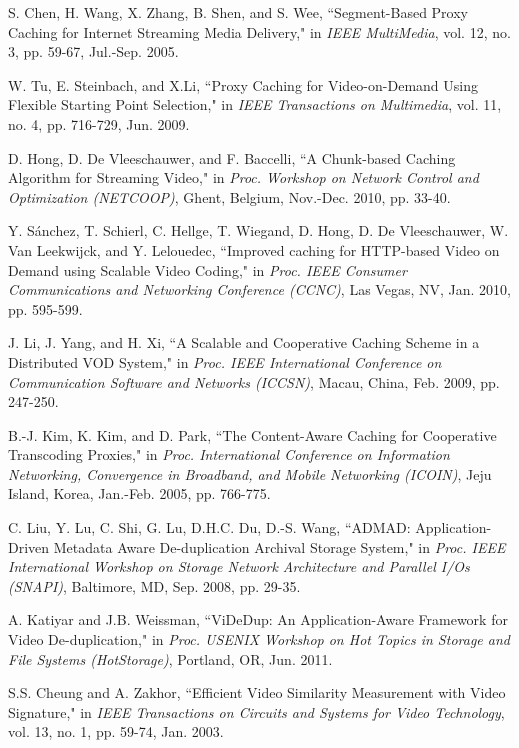 \documentclass{article}
\begin{document}
\begin{thebibliography}{99}


S. Chen, H. Wang, X. Zhang, B. Shen, and S. Wee, ``Segment-Based Proxy Caching for Internet Streaming Media Delivery," in \emph{IEEE MultiMedia}, vol. 12, no. 3, pp. 59-67, Jul.-Sep. 2005. 

W. Tu, E. Steinbach, and X.Li, ``Proxy Caching for Video-on-Demand Using Flexible Starting Point Selection," in \emph{IEEE Transactions on Multimedia}, vol. 11, no. 4, pp. 716-729, Jun. 2009.

D. Hong, D. De Vleeschauwer, and F. Baccelli, ``A Chunk-based Caching Algorithm for Streaming Video," in \emph{Proc. Workshop on Network Control and Optimization (NETCOOP)}, Ghent, Belgium, Nov.-Dec. 2010, pp. 33-40.

Y. S\'anchez, T. Schierl, C. Hellge, T. Wiegand, D. Hong, D. De Vleeschauwer, W. Van Leekwijck, and Y. Lelouedec, ``Improved caching for HTTP-based Video on Demand using Scalable Video Coding," in \emph{Proc. IEEE Consumer Communications and Networking Conference (CCNC)}, Las Vegas, NV, Jan. 2010, pp. 595-599.

J. Li, J. Yang, and H. Xi, ``A Scalable and Cooperative Caching Scheme in a Distributed VOD System," in \emph{Proc. IEEE International Conference on Communication Software and Networks (ICCSN)}, Macau, China, Feb. 2009, pp. 247-250.

B.-J. Kim, K. Kim, and D. Park, ``The Content-Aware Caching for Cooperative Transcoding Proxies," in \emph{Proc. International Conference on Information Networking, Convergence in Broadband, and Mobile Networking (ICOIN)}, Jeju Island, Korea, Jan.-Feb. 2005, pp. 766-775.

C. Liu, Y. Lu, C. Shi, G. Lu, D.H.C. Du, D.-S. Wang, ``ADMAD: Application-Driven Metadata Aware De-duplication Archival Storage System," in \emph{Proc. IEEE International Workshop on Storage Network Architecture and Parallel I/Os (SNAPI)}, Baltimore, MD, Sep. 2008, pp. 29-35.

A. Katiyar and J.B. Weissman, ``ViDeDup: An Application-Aware Framework for Video De-duplication," in \emph{Proc. USENIX Workshop on Hot Topics in Storage and File Systems (HotStorage)}, Portland, OR, Jun. 2011.

S.S. Cheung and A. Zakhor, ``Efficient Video Similarity Measurement with Video Signature," in \emph{IEEE Transactions on Circuits and Systems for Video Technology}, vol. 13, no. 1, pp. 59-74, Jan. 2003.


\end{thebibliography}
\end{document}
